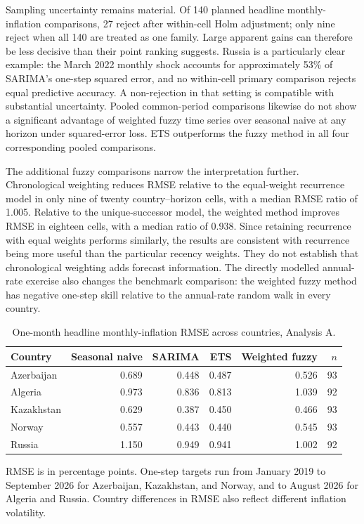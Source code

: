 \documentclass[11pt,a4paper]{article}
\begin{document}
Sampling uncertainty remains material. Of 140 planned headline monthly-inflation comparisons, 27 reject after within-cell Holm adjustment; only nine reject when all 140 are treated as one family. Large apparent gains can therefore be less decisive than their point ranking suggests. Russia is a particularly clear example: the March 2022 monthly shock accounts for approximately 53\% of SARIMA's one-step squared error, and no within-cell primary comparison rejects equal predictive accuracy. A non-rejection in that setting is compatible with substantial uncertainty. Pooled common-period comparisons likewise do not show a significant advantage of weighted fuzzy time series over seasonal naive at any horizon under squared-error loss. ETS outperforms the fuzzy method in all four corresponding pooled comparisons.

The additional fuzzy comparisons narrow the interpretation further. Chronological weighting reduces RMSE relative to the equal-weight recurrence model in only nine of twenty country--horizon cells, with a median RMSE ratio of 1.005. Relative to the unique-successor model, the weighted method improves RMSE in eighteen cells, with a median ratio of 0.938. Since retaining recurrence with equal weights performs similarly, the results are consistent with recurrence being more useful than the particular recency weights. They do not establish that chronological weighting adds forecast information. The directly modelled annual-rate exercise also changes the benchmark comparison: the weighted fuzzy method has negative one-step skill relative to the annual-rate random walk in every country.
\begin{table}[htbp]
\centering\small
\caption{One-month headline monthly-inflation RMSE across countries, Analysis A.}
\label{tab:countryaccuracy}
\begin{tabular}{@{}lrrrrr@{}}
\toprule
Country & Seasonal naive & SARIMA & ETS & Weighted fuzzy & $n$ \\
\midrule
Azerbaijan & 0.689 & 0.448 & 0.487 & 0.526 & 93 \\
Algeria & 0.973 & 0.836 & 0.813 & 1.039 & 92 \\
Kazakhstan & 0.629 & 0.387 & 0.450 & 0.466 & 93 \\
Norway & 0.557 & 0.443 & 0.440 & 0.545 & 93 \\
Russia & 1.150 & 0.949 & 0.941 & 1.002 & 92 \\
\bottomrule
\end{tabular}
\par\smallskip
\begin{minipage}{\linewidth}\footnotesize RMSE is in percentage points. One-step targets run from January 2019 to September 2026 for Azerbaijan, Kazakhstan, and Norway, and to August 2026 for Algeria and Russia. Country differences in RMSE also reflect different inflation volatility.\end{minipage}
\end{table}
\end{document}
